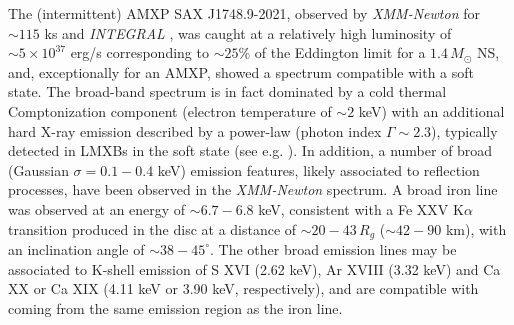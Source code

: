 \documentclass[graybox]{svmult}
\def \inte {{\em INTEGRAL\xspace}}
\def \xmm {{\em XMM-Newton\xspace}}
\begin{document}
The (intermittent) AMXP SAX J1748.9-2021, observed by \xmm{} for $\sim 115$ ks and \inte{} \cite{Pintore2016}, was caught at a relatively high luminosity of $\sim 5 \times 10^{37}$ erg/s corresponding to $\sim 25\%$ of the Eddington limit for a $1.4\, M_\odot$ NS, and, exceptionally for an AMXP, showed a spectrum compatible with a soft state. The broad-band spectrum is in fact dominated by a cold thermal Comptonization component (electron temperature of $\sim 2$ keV) with an additional hard X-ray emission described by a power-law (photon index $\Gamma \sim 2.3$), typically detected in LMXBs in the soft state (see e.g. \cite{DiSalvo2000}). In addition, a number of broad (Gaussian $\sigma = 0.1 - 0.4$ keV) emission features, likely associated to reflection processes, have been observed in the \xmm{} spectrum. A broad iron line was observed at an energy of $\sim 6.7-6.8$ keV, consistent with a Fe XXV K$\alpha$ transition produced in the disc at a distance of $\sim 20-43\, R_g$ ($\sim 42 - 90$ km), with an inclination angle of $\sim 38-45^\circ$. The other broad emission lines may be associated to K-shell emission of S XVI (2.62 keV), Ar XVIII (3.32 keV) and Ca XX or Ca XIX (4.11 keV or 3.90 keV, respectively), and are compatible with coming from the same emission region as the iron line. 
\end{document}
